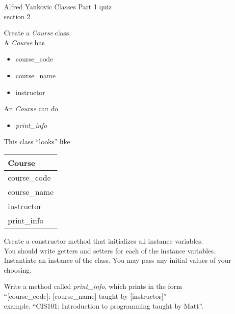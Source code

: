 \documentclass{article}
\newcommand{\tab}{\hspace*{0.25in}}
\begin{document}
\pagebreak
Alfred Yankovic \hfill Classes Part 1 quiz\\
section 2\\
\begin{enumerate}

	\begin{minipage}{.6\textwidth}
		\item Create a \textit{Course} class.\\
		A \textit{Course} has
		\begin{itemize}
			\item course\_code 
			\item course\_name
			\item instructor	
		\end{itemize}

		An \textit{Course} can do
		\begin{itemize}
			\item \textit{print\_info}
		\end{itemize}	
	\end{minipage}
	\begin{minipage}{.4\textwidth}
		This class ``looks'' like 
				
		\vspace*{1em}
		\begin{tabular}{|l|}
			\hline Course\\ \hline
			course\_code\\ course\_name\\ instructor\\ \hline
			print\_info\\  \hline
		\end{tabular}
	\end{minipage}

	\vspace*{2ex}
	Create a constructor method that initializes all instance variables.\\
	You should write getters and setters for each of the instance variables.\\
	Instantiate an instance of the class. You may pass any initial values of your choosing.

	Write a method called \textit{print\_info}, which prints in the form \\
		\tab \tab \tab ``[course\_code]: [course\_name] taught by [instructor]''\\
	example. ``CIS101: Introduction to programming taught by Matt''.\\


\end{enumerate}
\end{document}

